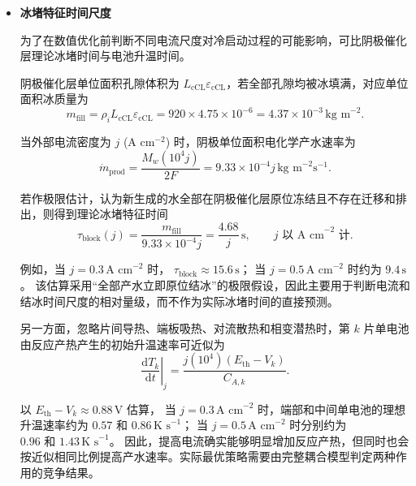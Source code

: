\documentclass[bwprint]{gmcmthesis}
\numberwithin{figure}{section}
\begin{document}
\begin{itemize}
\renewcommand{\labelitemi}{$\blacktriangleright$}
\item \textbf {冰堵特征时间尺度}

\noindent 为了在数值优化前判断不同电流尺度对冷启动过程的可能影响，可比阴极催化层理论冰堵时间与电池升温时间。

\noindent 阴极催化层单位面积孔隙体积为 \(L_{\text{cCL}}\varepsilon_{\text{cCL}}\)，若全部孔隙均被冰填满，对应单位面积冰质量为
\begin{equation}
m_{\text{fill}} = \rho_i L_{\text{cCL}} \varepsilon_{\text{cCL}} = 920 \times 4.75 \times 10^{-6} = 4.37 \times 10^{-3} \, \text{kg m}^{-2}. \tag{5-57}
\end{equation}

\noindent 当外部电流密度为 \(j\) (A cm\(^{-2}\)) 时，阴极单位面积电化学产水速率为
\begin{equation}
\dot{m}_{\text{prod}} = \frac{M_w(10^4 j)}{2F} = 9.33 \times 10^{-4} j \, \text{kg m}^{-2}\text{s}^{-1}. \tag{5-58}
\end{equation}

\noindent 若作极限估计，认为新生成的水全部在阴极催化层原位冻结且不存在迁移和排出，则得到理论冰堵特征时间
\begin{equation}
\tau_{\text{block}}(j) = \frac{m_{\text{fill}}}{9.33 \times 10^{-4} j} = \frac{4.68}{j} \, \text{s}, \qquad j \text{ 以 A cm}^{-2} \text{ 计}. \tag{5-59}
\end{equation}

\noindent 例如，当 \(j = 0.3 \, \text{A cm}^{-2}\) 时，
\(\tau_{\text{block}} \approx 15.6 \, \text{s}\)；
当 \(j = 0.5 \, \text{A cm}^{-2}\) 时约为 \(9.4 \, \text{s}\)。
该估算采用“全部产水立即原位结冰”的极限假设，因此主要用于判断电流和结冰时间尺度的相对量级，而不作为实际冰堵时间的直接预测。

\noindent 另一方面，忽略片间导热、端板吸热、对流散热和相变潜热时，第 \(k\) 片单电池由反应产热产生的初始升温速率可近似为
\begin{equation}
\left.\frac{\text{d}T_k}{\text{d}t}\right|_j = \frac{j(10^4)(E_{\text{th}} - V_k)}{C_{A,k}}. \tag{5-60}
\end{equation}

\noindent 以 \(E_{\text{th}} - V_k \approx 0.88 \, \text{V}\) 估算，
当 \(j = 0.3 \, \text{A cm}^{-2}\) 时，端部和中间单电池的理想升温速率约为 \(0.57 \text{ 和 } 0.86 \, \text{K s}^{-1}\)；
当 \(j = 0.5 \, \text{A cm}^{-2}\) 时分别约为 \(0.96 \text{ 和 } 1.43 \, \text{K s}^{-1}\)。
因此，提高电流确实能够明显增加反应产热，但同时也会按近似相同比例提高产水速率。实际最优策略需要由完整耦合模型判定两种作用的竞争结果。


\end{itemize}
\end{document}
